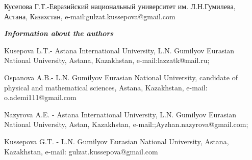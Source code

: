 Кусепова Г.Т.-Евразийский национальный университет им. Л.Н.Гумилева,
Астана, Казахстан, e-mail:gulzat.kussepova@gmail.com

\emph{{\bfseries Information about the authors}}

Kusepova L.T.- Astana International University, L.N. Gumilyov Eurasian
National University, Astana, Kazakhstan, e-mail:lazzatk@mail.ru;

Ospanova A.B.- L.N. Gumilyov Eurasian National University, candidate of
physical and mathematical sciences, Astana, Kazakhstan, e-mail:
o.ademi111@gmail.com

Nazyrova A.E. - Astana International University, L.N. Gumilyov Eurasian
National University, Astan, Kazakhstan,
e-mail:;Ayzhan.nazyrova@gmail.com;

Kussepova G.T. - L.N. Gumilyov Eurasian National University, Astana,
Kazakhstan, e-mail: gulzat.kussepova@gmail.com
